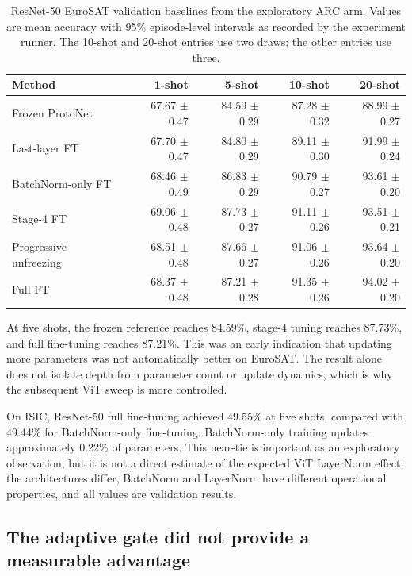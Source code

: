 \documentclass[11pt]{article}
\begin{document}
\begin{table}[t]
\centering
\small
\caption{ResNet-50 EuroSAT validation baselines from the exploratory ARC arm. Values are mean accuracy with 95\% episode-level intervals as recorded by the experiment runner. The 10-shot and 20-shot entries use two draws; the other entries use three.}
\label{tab:resnetbaseline}
\begin{tabular}{lrrrr}
\toprule
Method & 1-shot & 5-shot & 10-shot & 20-shot\\
\midrule
Frozen ProtoNet & 67.67 $\pm$ 0.47 & 84.59 $\pm$ 0.29 & 87.28 $\pm$ 0.32 & 88.99 $\pm$ 0.27\\
Last-layer FT & 67.70 $\pm$ 0.47 & 84.80 $\pm$ 0.29 & 89.11 $\pm$ 0.30 & 91.99 $\pm$ 0.24\\
BatchNorm-only FT & 68.46 $\pm$ 0.49 & 86.83 $\pm$ 0.29 & 90.79 $\pm$ 0.27 & 93.61 $\pm$ 0.20\\
Stage-4 FT & 69.06 $\pm$ 0.48 & 87.73 $\pm$ 0.27 & 91.11 $\pm$ 0.26 & 93.51 $\pm$ 0.21\\
Progressive unfreezing & 68.51 $\pm$ 0.48 & 87.66 $\pm$ 0.27 & 91.06 $\pm$ 0.26 & 93.64 $\pm$ 0.20\\
Full FT & 68.37 $\pm$ 0.48 & 87.21 $\pm$ 0.28 & 91.35 $\pm$ 0.26 & 94.02 $\pm$ 0.20\\
\bottomrule
\end{tabular}
\end{table}

At five shots, the frozen reference reaches 84.59\%, stage-4 tuning reaches 87.73\%, and full fine-tuning reaches 87.21\%. This was an early indication that updating more parameters was not automatically better on EuroSAT. The result alone does not isolate depth from parameter count or update dynamics, which is why the subsequent ViT sweep is more controlled.

On ISIC, ResNet-50 full fine-tuning achieved 49.55\% at five shots, compared with 49.44\% for BatchNorm-only fine-tuning. BatchNorm-only training updates approximately 0.22\% of parameters. This near-tie is important as an exploratory observation, but it is not a direct estimate of the expected ViT LayerNorm effect: the architectures differ, BatchNorm and LayerNorm have different operational properties, and all values are validation results.

\subsection{The adaptive gate did not provide a measurable advantage}
\end{document}
